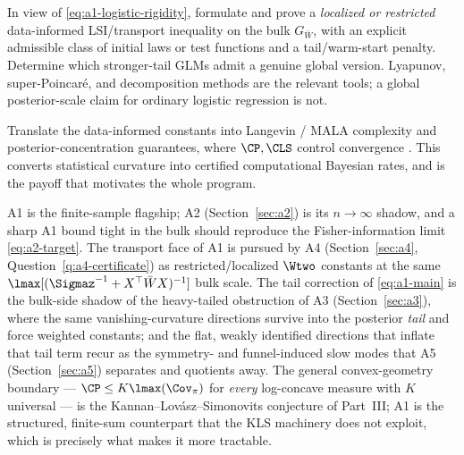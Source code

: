 \documentclass[../../main.tex]{subfiles}
\begin{document}
\begin{question}
\label{q:a1-lsi}
In view of \eqref{eq:a1-logistic-rigidity}, formulate and prove a \emph{localized or restricted}
data-informed LSI/transport inequality on the bulk $G_{\bar W}$, with an explicit admissible class
of initial laws or test functions and a tail/warm-start penalty. Determine which stronger-tail
GLMs admit a genuine global version. Lyapunov, super-Poincar\'e, and decomposition methods
\cite{CattiauxGuillinWangWu2009,BakryCattiauxGuillin2008,CattiauxGuillin2010,MenzSchlichting2014}
are the relevant tools; a global posterior-scale claim for ordinary logistic regression is not.
\end{question}

\begin{question}
\label{q:a1-sampling}
Translate the data-informed constants into Langevin / MALA complexity and posterior-concentration
guarantees, where $\CP,\CLS$ control convergence
\cite{ChewiEtAl2024LMC,GadatPanloupPellegrini2020}. This converts statistical curvature into
certified computational Bayesian rates, and is the payoff that motivates the whole program.
\end{question}

\begin{remark}
\label{rem:a1-relations}
A1 is the finite-sample flagship; A2 (Section~\ref{sec:a2}) is its $n\to\infty$ shadow, and a
sharp A1 bound tight in the bulk should reproduce the Fisher-information limit
\eqref{eq:a2-target}. The transport face of A1 is pursued by A4 (Section~\ref{sec:a4},
Question~\ref{q:a4-certificate}) as restricted/localized $\Wtwo$ constants at the same
$\lmax[(\Sigmaz^{-1}+X^\top\bar W X)^{-1}]$ bulk scale. The tail correction of \eqref{eq:a1-main}
is the bulk-side shadow of the heavy-tailed obstruction of A3 (Section~\ref{sec:a3}), where the
same vanishing-curvature directions survive into the posterior \emph{tail} and force weighted
constants; and the flat, weakly identified directions that inflate that tail term recur as the
symmetry- and funnel-induced slow modes that A5 (Section~\ref{sec:a5}) separates and quotients
away. The general convex-geometry boundary ---
$\CP\le K\lmax(\Cov_\pi)$ for \emph{every} log-concave measure with $K$ universal --- is the
Kannan--Lov\'asz--Simonovits conjecture of Part~III; A1 is the structured, finite-sum counterpart
that the KLS machinery does not exploit, which is precisely what makes it more tractable.
\end{remark}
\end{document}

